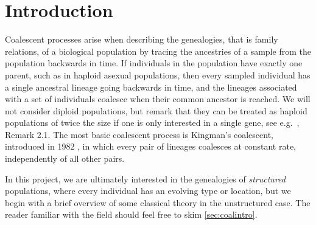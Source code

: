 \documentclass[reqno,draft]{amsart}
\numberwithin{equation}{section}
\theoremstyle{plain}
\theoremstyle{remark}
\begin{document}
\maketitle


\section{Introduction}
Coalescent processes arise when describing the genealogies, that is family relations, of a biological population by tracing the ancestries of a sample from the population backwards in time. If individuals in the population have exactly one parent, such as in haploid asexual populations, then every sampled individual has a single ancestral lineage going backwards in time, and the lineages associated with a set of individuals coalesce when their common ancestor is reached. We will not consider diploid populations, but remark that they can be treated as haploid populations of twice the size if one is only interested in a single gene, see e.g.~\cite{E2008}, Remark 2.1.
The most basic coalescent process is Kingman's coalescent, introduced in 1982 \cite{kingman1982}, in which every pair of lineages coalesces at constant rate, independently of all other pairs.

In this project, we are ultimately interested in the genealogies of \emph{structured} populations, where every individual has an evolving type or location, but we begin with a brief overview of some classical theory in the unstructured case.
The reader familiar with the field should feel free to skim \cref{sec:coalintro}.
\end{document}
